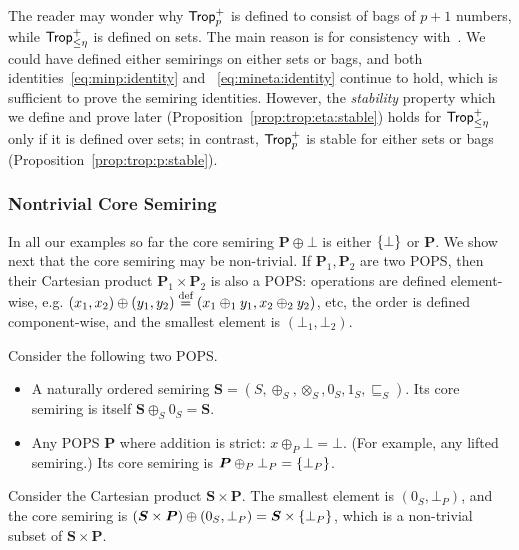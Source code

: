 The reader may wonder why $\text{\sf Trop}^+_p$ is defined to consist of bags of
$p+1$ numbers, while $\text{\sf Trop}^+_{\leq \eta}$ is defined on sets.  The main
reason is for consistency with~\cite{semiring_book}.  We could have
defined either semirings on either sets or bags, and both
identities~\eqref{eq:minp:identity} and ~\eqref{eq:mineta:identity}
continue to hold, which is sufficient to prove the semiring
identities.  However, the {\em stability} property which we define and
prove later (Proposition~\ref{prop:trop:eta:stable}) holds for
$\text{\sf Trop}^+_{\leq \eta}$ only if it is defined over sets; in contrast,
$\text{\sf Trop}^+_p$ is stable for either sets or bags
(Proposition~\ref{prop:trop:p:stable}).

\subsubsection{Nontrivial Core Semiring}

In all our examples so far the core semiring $\bm P \oplus \bot$ is
either $\{\bot\}$ or $\bm P$.  We show next that the core semiring
may be non-trivial.  If $\bm P_1, \bm P_2$ are two POPS, then their
Cartesian product $\bm P_1 \times \bm P_2$ is also a POPS: operations
are defined element-wise, e.g.
$(x_1,x_2) \oplus (y_1,y_2) \stackrel{\text{def}}{=} (x_1\oplus_1 y_1, x_2 \oplus_2
y_2)$, etc, the order is defined component-wise, and the smallest
element is $(\bot_1, \bot_2)$.

\begin{ex} Consider the following two POPS.
  \begin{itemize}
  \item A naturally ordered semiring
    $\bm S = (S, \oplus_S, \otimes_S, 0_S, 1_S, \sqsubseteq_S)$.  Its
    core semiring is itself $\bm S \oplus_S 0_S=\bm S$.
  \item Any POPS $\bm P$ where addition is strict:
    $x \oplus_P \bot = \bot$.  (For example, any lifted semiring.)
    Its core semiring is $\bm P \oplus_P \bot_P = \{\bot_P\}$.
  \end{itemize}
  Consider the Cartesian product $\bm S \times \bm P$.  The smallest
  element is $(0_S,\bot_P)$, and the core semiring is
  $(\bm S \times \bm P) \oplus (0_S,\bot_P) = \bm S \times
  \{\bot_P\}$, which is a non-trivial subset of
  $\bm S \times \bm P$.
\end{ex}

\section{\datalogo}
\label{sec:datalogo}


